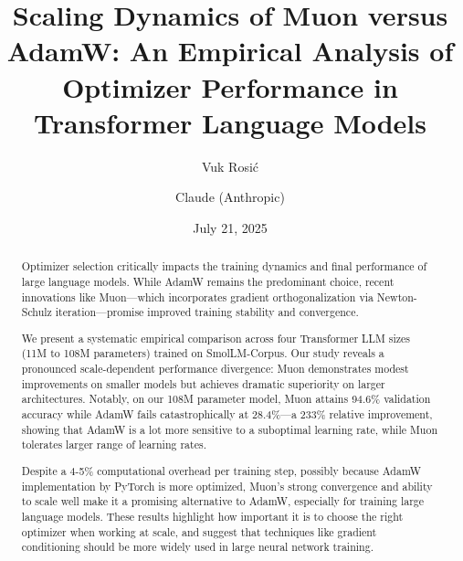 \documentclass[11pt,a4paper]{article}
\title{\Large\bfseries Scaling Dynamics of Muon versus AdamW: An Empirical Analysis of Optimizer Performance in Transformer Language Models}
\author[1]{Vuk Rosić}
\author[2]{Claude (Anthropic)}
\affil[1]{Óbuda University, \texttt{vukrosic1@gmail.com}}
\affil[2]{Anthropic}
\date{July 21, 2025}
\begin{document}
\maketitle

\begin{abstract}
Optimizer selection critically impacts the training dynamics and final performance of large language models. While AdamW remains the predominant choice, recent innovations like Muon—which incorporates gradient orthogonalization via Newton-Schulz iteration—promise improved training stability and convergence. 

We present a systematic empirical comparison across four Transformer LLM sizes (11M to 108M parameters) trained on SmolLM-Corpus. Our study reveals a pronounced scale-dependent performance divergence: Muon demonstrates modest improvements on smaller models but achieves dramatic superiority on larger architectures. Notably, on our 108M parameter model, Muon attains 94.6\% validation accuracy while AdamW fails catastrophically at 28.4\%—a 233\% relative improvement, showing that AdamW is a lot more sensitive to a suboptimal learning rate, while Muon tolerates larger range of learning rates.

Despite a 4-5\% computational overhead per training step, possibly because AdamW implementation by PyTorch is more optimized, Muon’s strong convergence and ability to scale well make it a promising alternative to AdamW, especially for training large language models. These results highlight how important it is to choose the right optimizer when working at scale, and suggest that techniques like gradient conditioning should be more widely used in large neural network training.
\end{abstract}
\end{document}
